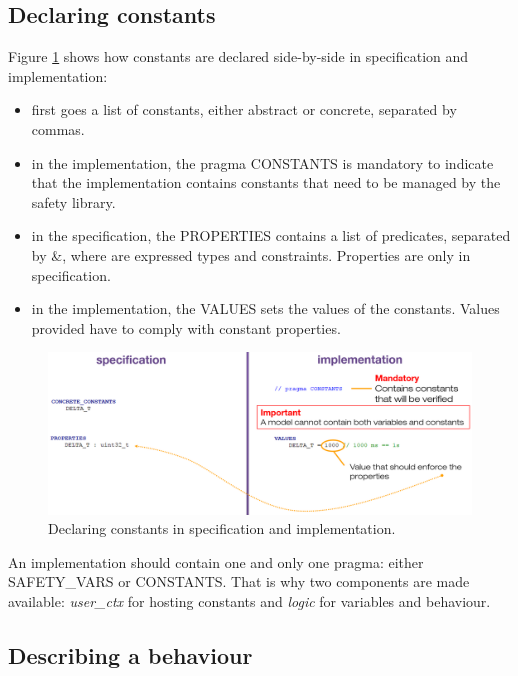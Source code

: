 \subsection{Declaring constants}

Figure \ref{programming:constant-decl} shows how constants are declared side-by-side in specification and implementation:
\begin{itemize}
    \item first goes a list of constants, either abstract or concrete, separated by commas.
    \item in the implementation, the pragma CONSTANTS is mandatory to indicate that the implementation contains constants that need to be managed by the safety library.
    \item in the specification, the PROPERTIES contains a list of predicates, separated by \&, where are expressed types and constraints. Properties are only in specification.
    \item in the implementation, the VALUES sets the values of the constants. Values provided have to comply with constant properties.
\end{itemize}
\begin{figure}[ht]
\centering\includegraphics[scale=0.25]{Pictures/chapterProgramming/constants-decl.png}
\caption{Declaring constants in specification and implementation. }
\label{programming:constant-decl}
\end{figure}  

\begin{remark}
An implementation should contain one and only one pragma: either SAFETY\_VARS or CONSTANTS. That is why two components are made available: \textit{user\_ctx} for hosting constants and \textit{logic} for variables and behaviour.
\end{remark}

\subsection{Describing a behaviour}

